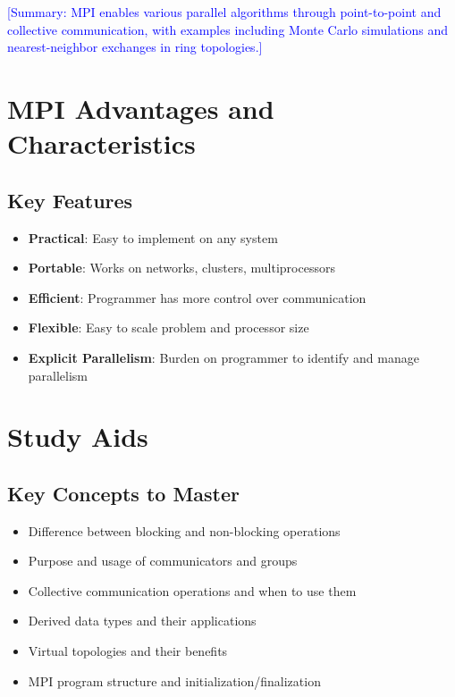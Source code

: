 \documentclass[12pt]{article}
\begin{document}
\textcolor{blue}{[Summary: MPI enables various parallel algorithms through point-to-point and collective communication, with examples including Monte Carlo simulations and nearest-neighbor exchanges in ring topologies.]}

\section{MPI Advantages and Characteristics}

\subsection{Key Features}
\begin{itemize}
    \item \textbf{Practical}: Easy to implement on any system
    \item \textbf{Portable}: Works on networks, clusters, multiprocessors
    \item \textbf{Efficient}: Programmer has more control over communication
    \item \textbf{Flexible}: Easy to scale problem and processor size
    \item \textbf{Explicit Parallelism}: Burden on programmer to identify and manage parallelism
\end{itemize}

\section{Study Aids}

\subsection*{Key Concepts to Master}
\begin{itemize}
    \item Difference between blocking and non-blocking operations
    \item Purpose and usage of communicators and groups
    \item Collective communication operations and when to use them
    \item Derived data types and their applications
    \item Virtual topologies and their benefits
    \item MPI program structure and initialization/finalization
\end{itemize}
\end{document}
